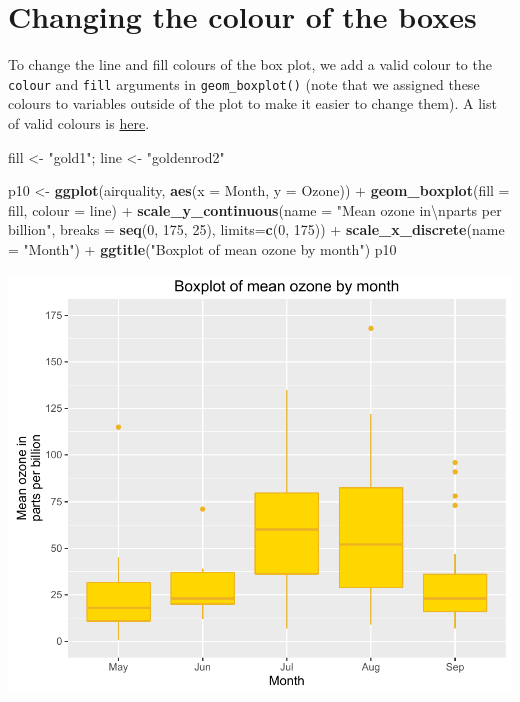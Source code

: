 \documentclass[]{article}
\newenvironment{Shaded}{\begin{snugshade}}{\end{snugshade}}
\newcommand{\KeywordTok}[1]{\textcolor[rgb]{0.13,0.29,0.53}{\textbf{{#1}}}}
\newcommand{\DataTypeTok}[1]{\textcolor[rgb]{0.13,0.29,0.53}{{#1}}}
\newcommand{\DecValTok}[1]{\textcolor[rgb]{0.00,0.00,0.81}{{#1}}}
\newcommand{\CharTok}[1]{\textcolor[rgb]{0.31,0.60,0.02}{{#1}}}
\newcommand{\StringTok}[1]{\textcolor[rgb]{0.31,0.60,0.02}{{#1}}}
\newcommand{\NormalTok}[1]{{#1}}
\begin{document}
\section{Changing the colour of the
boxes}\label{changing-the-colour-of-the-boxes}

To change the line and fill colours of the box plot, we add a valid
colour to the \texttt{colour} and \texttt{fill} arguments in
\texttt{geom\_boxplot()} (note that we assigned these colours to
variables outside of the plot to make it easier to change them). A list
of valid colours is
\href{http://www.stat.columbia.edu/~tzheng/files/Rcolor.pdf}{here}.

\begin{Shaded}
\begin{Highlighting}[]
\NormalTok{fill <-}\StringTok{ "gold1"}\NormalTok{; line <-}\StringTok{ "goldenrod2"}

\NormalTok{p10 <-}\StringTok{ }\KeywordTok{ggplot}\NormalTok{(airquality, }\KeywordTok{aes}\NormalTok{(}\DataTypeTok{x =} \NormalTok{Month, }\DataTypeTok{y =} \NormalTok{Ozone)) +}\StringTok{ }
\StringTok{  }\KeywordTok{geom_boxplot}\NormalTok{(}\DataTypeTok{fill =} \NormalTok{fill, }\DataTypeTok{colour =} \NormalTok{line) +}
\StringTok{  }\KeywordTok{scale_y_continuous}\NormalTok{(}\DataTypeTok{name =} \StringTok{"Mean ozone in}\CharTok{\textbackslash{}n}\StringTok{parts per billion"}\NormalTok{,}
    \DataTypeTok{breaks =} \KeywordTok{seq}\NormalTok{(}\DecValTok{0}\NormalTok{, }\DecValTok{175}\NormalTok{, }\DecValTok{25}\NormalTok{), }\DataTypeTok{limits=}\KeywordTok{c}\NormalTok{(}\DecValTok{0}\NormalTok{, }\DecValTok{175}\NormalTok{)) +}
\StringTok{  }\KeywordTok{scale_x_discrete}\NormalTok{(}\DataTypeTok{name =} \StringTok{"Month"}\NormalTok{) +}
\StringTok{  }\KeywordTok{ggtitle}\NormalTok{(}\StringTok{"Boxplot of mean ozone by month"}\NormalTok{)}
\NormalTok{p10}
\end{Highlighting}
\end{Shaded}

\begin{center}\includegraphics{10_Boxplots_pdf/box_6-1} \end{center}
\end{document}
